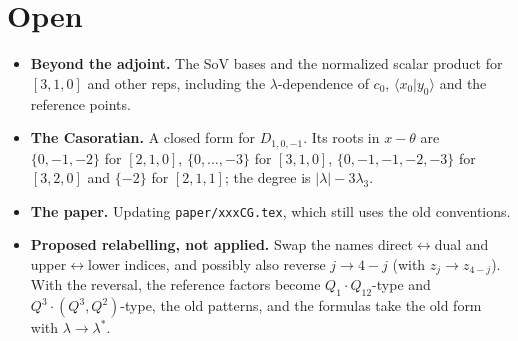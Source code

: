\documentclass[11pt]{article}
\newcommand{\nb}[1]{\texttt{#1}}
\begin{document}
\section{Open}
\begin{itemize}
\item \textbf{Beyond the adjoint.} The SoV bases and the normalized scalar product for $[3,1,0]$ and other reps, including the $\lambda$-dependence of $c_0$, $\langle x_0|y_0\rangle$ and the reference points.
\item \textbf{The Casoratian.} A closed form for $D_{1,0,-1}$. Its roots in $x-\theta$ are $\{0,-1,-2\}$ for $[2,1,0]$, $\{0,\dots,-3\}$ for $[3,1,0]$, $\{0,-1,-1,-2,-3\}$ for $[3,2,0]$ and $\{-2\}$ for $[2,1,1]$; the degree is $|\lambda|-3\lambda_3$.
\item \textbf{The paper.} Updating \nb{paper/xxxCG.tex}, which still uses the old conventions.
\item \textbf{Proposed relabelling, not applied.} Swap the names direct$\leftrightarrow$dual and upper$\leftrightarrow$lower indices, and possibly also reverse $j\to4-j$ (with $z_j\to z_{4-j}$). With the reversal, the reference factors become $Q_1\cdot Q_{12}$-type and $Q^3\cdot(Q^3,Q^2)$-type, the old patterns, and the formulas take the old form with $\lambda\to\lambda^*$.
\end{itemize}
\end{document}

